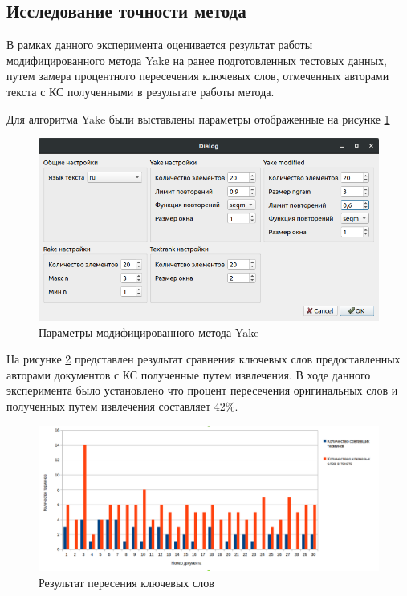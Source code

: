 \subsection{Исследование точности метода}
В рамках данного эксперимента оценивается результат работы модифицированного метода Yakе на ранее подготовленных тестовых данных, путем замера процентного пересечения ключевых слов, отмеченных авторами текста с КС полученными в результате работы метода.

Для алгоритма Yake были выставлены параметры отображенные на рисунке \ref{fig:experiment11}
\begin{figure}[!h]
	\centering
	\includegraphics[width=1\linewidth]{src/img/experiment/experiment_1_1}
	\caption{Параметры модифицированного метода Yake}
	\label{fig:experiment11}
\end{figure}

На рисунке \ref{fig:experiment12} представлен результат сравнения ключевых слов предоставленных авторами документов с КС полученные путем извлечения.
В ходе данного эксперимента было установлено что процент пересечения оригинальных слов и полученных путем извлечения составляет $42\%$.
\begin{figure}[!h]
	\centering
	\includegraphics[width=1\linewidth]{src/img/experiment/experiment_1_2}
	\caption{Результат пересения ключевых слов}
	\label{fig:experiment12}
\end{figure}

